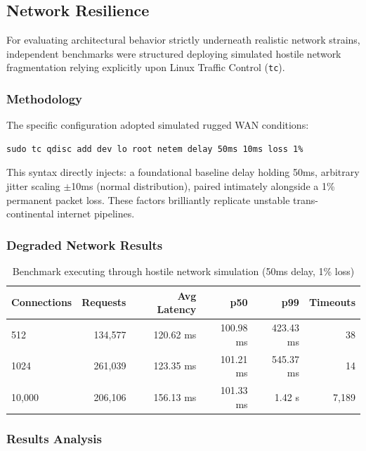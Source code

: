 \subsection{Network Resilience}

For evaluating architectural behavior strictly underneath realistic network strains, independent benchmarks were structured deploying simulated hostile network fragmentation relying explicitly upon Linux Traffic Control (\texttt{tc}).

\subsubsection{Methodology}

The specific configuration adopted simulated rugged WAN conditions:
\begin{verbatim}
sudo tc qdisc add dev lo root netem delay 50ms 10ms loss 1%
\end{verbatim}

This syntax directly injects: a foundational baseline delay holding 50ms, arbitrary jitter scaling $\pm$10ms (normal distribution), paired intimately alongside a 1\% permanent packet loss. These factors brilliantly replicate unstable trans-continental internet pipelines.

\subsubsection{Degraded Network Results}

\begin{table}[H]
\centering
\caption{Benchmark executing through hostile network simulation (50ms delay, 1\% loss)}
\label{tab:hostile_network}
\begin{tabular}{|l|r|r|r|r|r|}
\hline
\textbf{Connections} & \textbf{Requests} & \textbf{Avg Latency} & \textbf{p50} & \textbf{p99} & \textbf{Timeouts} \\
\hline
512 & 134,577 & 120.62 ms & 100.98 ms & 423.43 ms & 38 \\
1024 & 261,039 & 123.35 ms & 101.21 ms & 545.37 ms & 14 \\
10,000 & 206,106 & 156.13 ms & 101.33 ms & 1.42 s & 7,189 \\
\hline
\end{tabular}
\end{table}

\subsubsection{Results Analysis}


